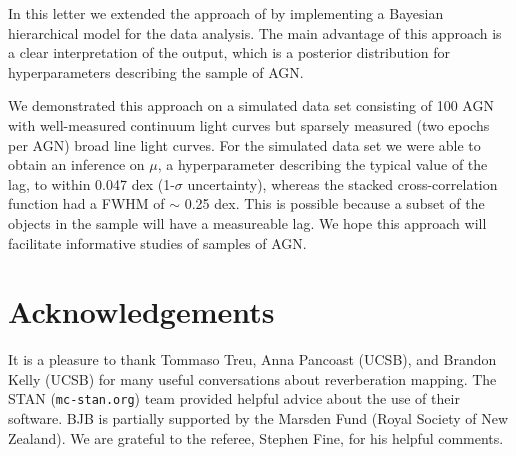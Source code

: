 \documentclass[useAMS,usenatbib]{mn2e}
\begin{document}
In this letter we extended the approach of \citet{2012MNRAS.427.2701F} by
implementing a Bayesian hierarchical model for the data analysis. The main
advantage of this approach is a clear interpretation of the output, which is
a posterior distribution for hyperparameters describing the sample of AGN.

We demonstrated this approach on a simulated data set consisting of 100 AGN
with well-measured continuum light curves but sparsely measured (two epochs per
AGN) broad line light curves. For the simulated data set we were able to obtain
an inference on $\mu$, a hyperparameter describing the typical value of the lag,
to within 0.047 dex (1-$\sigma$ uncertainty), whereas the stacked cross-correlation
function had a FWHM of $\sim$ 0.25 dex. This is possible because a subset of
the objects in the sample will have a measureable lag. We hope this approach
will facilitate informative studies of samples of AGN.

\section*{Acknowledgements}
It is a pleasure to thank Tommaso Treu, Anna Pancoast (UCSB), and
Brandon Kelly (UCSB) for many
useful conversations about reverberation mapping. The STAN ({\tt mc-stan.org})
team provided helpful advice about the use of their software. BJB is partially
supported by the Marsden Fund (Royal Society of New Zealand). We are grateful
to the referee, Stephen Fine, for his helpful comments.
\end{document}
